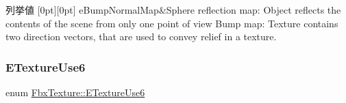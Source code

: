 \begin{DoxyEnumFields}{列挙値}
[0pt][0pt]{}\mbox{\label{class_fbx_texture_af034d10e711237dd9ae92a5965787f25a7131fd3111db906c4242f2009191344e}} 
e\+Bump\+Normal\+Map&Sphere reflection map\+: Object reflects the contents of the scene from only one point of view Bump map\+: Texture contains two direction vectors, that are used to convey relief in a texture. \\
\hline

\end{DoxyEnumFields}
\mbox{\label{class_fbx_texture_a321c489f8a8a5294298ffbf0ed361db9}} 
\subsubsection{\texorpdfstring{E\+Texture\+Use6}{ETextureUse6}}
{\footnotesize\ttfamily enum \hyperlink{class_fbx_texture_a321c489f8a8a5294298ffbf0ed361db9}{Fbx\+Texture\+::\+E\+Texture\+Use6}}

